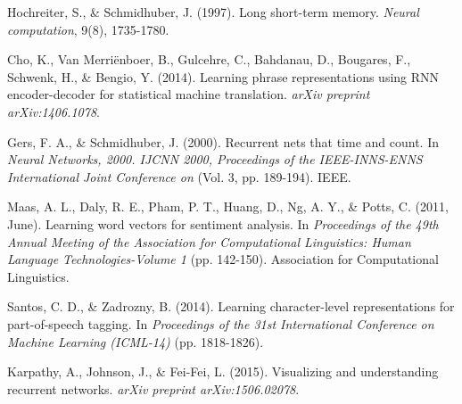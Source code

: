 \documentclass[10pt,twocolumn,letterpaper]{article}
\begin{document}
\begin{thebibliography}{9}
Hochreiter, S., \& Schmidhuber, J. (1997). Long short-term memory. \textit{Neural computation}, 9(8), 1735-1780.

Cho, K., Van Merriënboer, B., Gulcehre, C., Bahdanau, D., Bougares, F., Schwenk, H., \& Bengio, Y. (2014). Learning phrase representations using RNN encoder-decoder for statistical machine translation. \textit{arXiv preprint arXiv:1406.1078}.

Gers, F. A., \& Schmidhuber, J. (2000). Recurrent nets that time and count. In \textit{Neural Networks, 2000. IJCNN 2000, Proceedings of the IEEE-INNS-ENNS International Joint Conference on} (Vol. 3, pp. 189-194). IEEE.

Maas, A. L., Daly, R. E., Pham, P. T., Huang, D., Ng, A. Y., \& Potts, C. (2011, June). Learning word vectors for sentiment analysis. In \textit{Proceedings of the 49th Annual Meeting of the Association for Computational Linguistics: Human Language Technologies-Volume 1} (pp. 142-150). Association for Computational Linguistics.

Santos, C. D., \& Zadrozny, B. (2014). Learning character-level representations for part-of-speech tagging. In \textit{Proceedings of the 31st International Conference on Machine Learning (ICML-14)} (pp. 1818-1826).

Karpathy, A., Johnson, J., \& Fei-Fei, L. (2015). Visualizing and understanding recurrent networks. \textit{arXiv preprint arXiv:1506.02078}.
\end{thebibliography}
\end{document}
